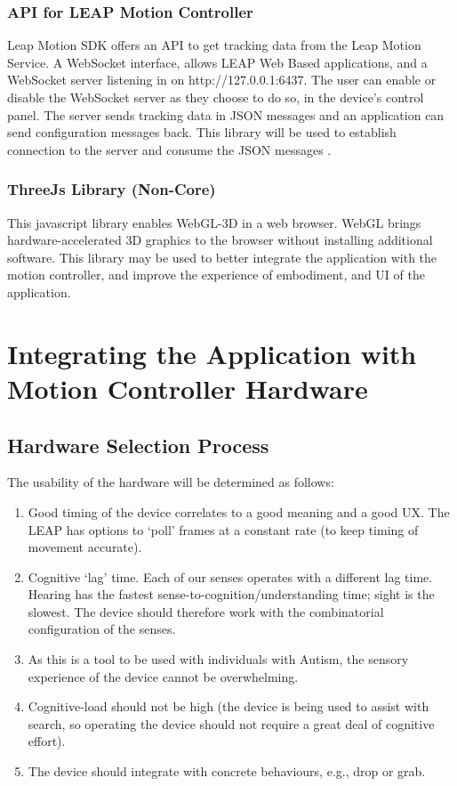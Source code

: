 \documentclass[10pt]{article}
\begin{document}
\subsubsection{API for LEAP Motion Controller}
Leap Motion SDK offers an API to get tracking data from the Leap Motion Service. A WebSocket interface, allows LEAP Web Based applications, and a WebSocket server listening in on http://127.0.0.1:6437. The user can enable or disable the WebSocket server as they choose to do so, in the device's control panel.
The server sends tracking data in JSON messages and an application can send configuration messages back. This library will be used to establish connection to the server and consume the JSON messages \cite{leap}. 


\subsubsection{ThreeJs Library (Non-Core)}
This javascript library enables WebGL-3D in a web browser. WebGL brings hardware-accelerated 3D graphics to the browser without installing additional software. This library may be used to better integrate the application with the motion controller, and improve the experience of embodiment, and UI of the application.


\section{Integrating the Application with Motion Controller Hardware }\label{hardware}
\subsection{Hardware Selection Process}
The usability of the hardware will be determined as follows: 
\begin{enumerate}
\item Good timing of the device correlates to a good meaning and a good UX. The LEAP has options to ‘poll’ frames at a constant rate (to keep timing of movement accurate).
\item Cognitive ‘lag’ time. Each of our senses operates with a different lag time. Hearing has the fastest sense-to-cognition/understanding time; sight is the slowest. The device should therefore work with the combinatorial configuration of the senses.
\item As this is a tool to be used with individuals with Autism, the sensory experience of the device cannot be overwhelming.
\item Cognitive-load should not be high (the device is being used to assist with search, so operating the device should not require a great deal of cognitive effort).
\item The device should integrate with concrete behaviours, e.g., drop or grab. 

\end{enumerate}
\end{document}
